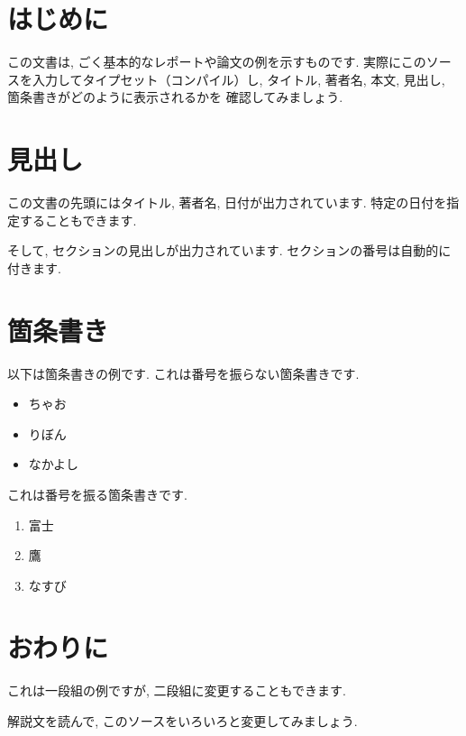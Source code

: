 \section{はじめに}

この文書は, ごく基本的なレポートや論文の例を示すものです. 
実際にこのソースを入力してタイプセット（コンパイル）し, 
タイトル, 著者名, 本文, 見出し, 箇条書きがどのように表示されるかを
確認してみましょう. 

\section{見出し}

この文書の先頭にはタイトル, 著者名, 日付が出力されています. 
特定の日付を指定することもできます. 

そして, セクションの見出しが出力されています. 
セクションの番号は自動的に付きます. 

\section{箇条書き}

以下は箇条書きの例です. これは番号を振らない箇条書きです. 

\begin{itemize}
  \item ちゃお
  \item りぼん
  \item なかよし
\end{itemize}

これは番号を振る箇条書きです. 

\begin{enumerate}
  \item 富士
  \item 鷹
  \item なすび
\end{enumerate}

\section{おわりに}

これは一段組の例ですが, 二段組に変更することもできます. 

解説文を読んで, このソースをいろいろと変更してみましょう. 